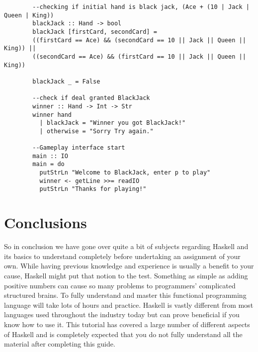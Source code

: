 \documentclass{article}
\begin{document}
\begin{lstlisting}
        --checking if initial hand is black jack, (Ace + (10 | Jack | Queen | King))
        blackJack :: Hand -> bool
        blackJack [firstCard, secondCard] = 
        ((firstCard == Ace) && (secondCard == 10 || Jack || Queen || King)) ||
        ((secondCard == Ace) && (firstCard == 10 || Jack || Queen || King))
        
        blackJack _ = False
        
        --check if deal granted BlackJack
        winner :: Hand -> Int -> Str
        winner hand
          | blackJack = "Winner you got BlackJack!"
          | otherwise = "Sorry Try again."
        
        --Gameplay interface start
        main :: IO
        main = do
          putStrLn "Welcome to BlackJack, enter p to play"
          winner <- getLine >>= readIO
          putStrLn "Thanks for playing!"

    \end{lstlisting}

\section{Conclusions}\label{conclusions}

So in conclusion we have gone over quite a bit of subjects regarding Haskell and its basics to understand completely before undertaking an assignment of your own. While having previous knowledge and experience is usually a benefit to your cause, Haskell might put that notion to the test. Something as simple as adding positive numbers can cause so many problems to programmers' complicated structured brains. To fully understand and master this functional programming language will take lots of hours and practice. Haskell is vastly different from most languages used throughout the industry today but can prove beneficial if you know how to use it. This tutorial has covered a large number of different aspects of Haskell and is completely expected that you do not fully understand all the material after completing this guide.
\end{document}
